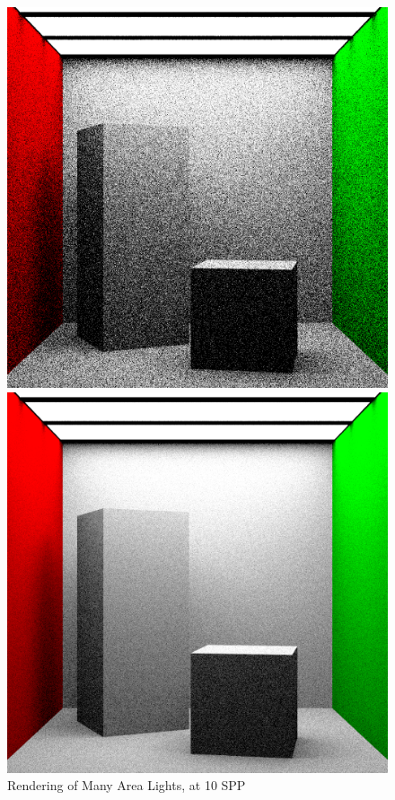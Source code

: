 \documentclass[a4paper]{myarticle}
\begin{document}
\begin{figure}[H]
  \begin{minipage}[t]{.3\textwidth}
      \centering
      \includegraphics[width=\textwidth]{q3/many_1_10.png}
      \caption{Rendering of Many Area Lights, at 10 SPP}
  \end{minipage}
  \hfill
  \begin{minipage}[t]{.3\textwidth}
      \centering
      \includegraphics[width=\textwidth]{q3/many_1_100.png}

\end{minipage}
\end{figure}
\end{document}
